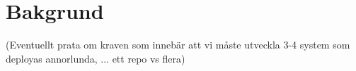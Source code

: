 \section{Bakgrund}
\label{sec:bjorn-background}

(Eventuellt prata om kraven som innebär att vi måste utveckla 3-4 system som deployas annorlunda, ... ett repo vs flera)